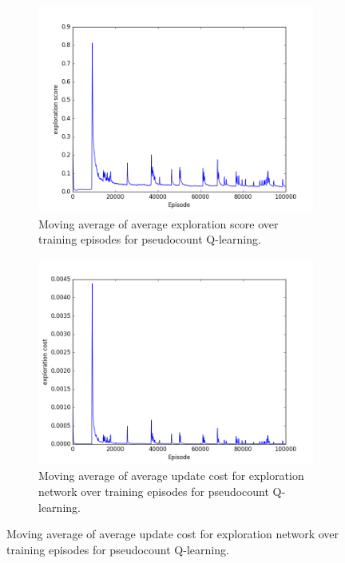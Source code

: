 \documentclass{article}
\begin{document}
\begin{figure}[!ht]
\begin{subfigure}[t]{.45\textwidth}
  \label{fig:count_var}
\end{subfigure}\vfill
\begin{subfigure}[t]{.45\textwidth}
  \centering
      \includegraphics[width=1\textwidth]{pics/7x7_count_exp_score.png}
  \caption{Moving average of average exploration score over training episodes for pseudocount Q-learning.}
  \label{fig:count_exp}
\end{subfigure}\hfill
\begin{subfigure}[t]{.45\textwidth}
  \centering
      \includegraphics[width=1\textwidth]{pics/7x7_count_exp_cost.png}
  \caption{Moving average of average update cost for exploration network over training episodes for pseudocount Q-learning.}
  \label{fig:count_exp_cost}

\end{subfigure}
\end{figure}
\end{document}

